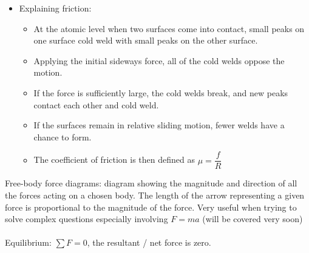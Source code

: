 \begin{itemize}
\begin{itemize}
	\item Explaining friction:
	\begin{itemize}
	    \item At the atomic level when two surfaces come into contact, small peaks on one surface cold weld with small peaks on the other surface.
	    \item Applying the initial sideways force, all of the cold welds oppose the motion.
	    \item If the force is sufficiently large, the cold welds break, and new peaks contact each other and cold weld.
	    \item If the surfaces remain in relative sliding motion, fewer welds have a chance to form.
	    \item The coefficient of friction is then defined as $\mu=\dfrac{f}{R}$
	    \end{itemize}
\end{itemize}
  \end{itemize}
Free-body force diagrams: diagram showing the magnitude and direction of all the forces acting on a chosen body. The length of the arrow representing a given force is proportional to the magnitude of the force. Very useful when trying to solve complex questions especially involving $F=ma$ (will be covered very soon)\\\\
Equilibrium: $\displaystyle \sum F=0$, the resultant / net force is zero.

